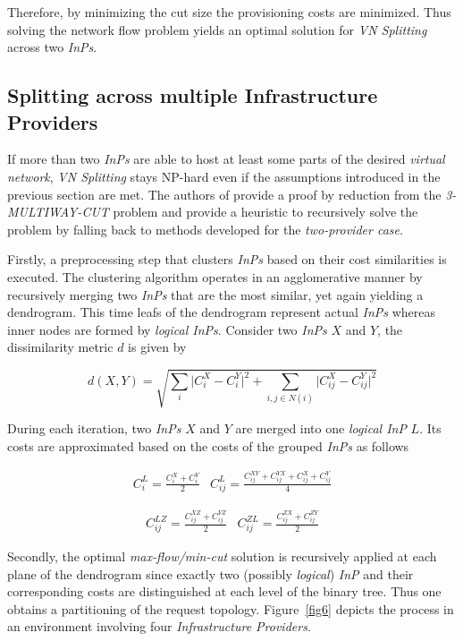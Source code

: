 \documentclass[prodmode,acmtomccap]{acmlarge}
\providecommand{\abs}[1]{\lvert#1\rvert}
\begin{document}
Therefore, by minimizing the cut size the provisioning costs are minimized. Thus  solving the network flow problem yields an optimal solution for \emph{VN Splitting} across two \emph{InPs}.

\subsection{Splitting across multiple Infrastructure Providers}
If more than two \emph{InPs} are able to host at least some parts of the desired \emph{virtual network}, \emph{VN Splitting} stays NP-hard even if the assumptions introduced in the previous section are met.
The authors of  provide a proof by reduction from the \emph{3-MULTIWAY-CUT} problem and provide a heuristic to recursively solve the problem by falling back to methods developed
for the \emph{two-provider case}.

Firstly, a preprocessing step that clusters \emph{InPs} based on their cost similarities is executed. The clustering algorithm operates in an agglomerative manner by recursively merging two
\emph{InPs} that are the most similar, yet again yielding a dendrogram. This time leafs of the dendrogram represent actual \emph{InPs}
whereas inner nodes are formed by \emph{logical InPs}. Consider two \emph{InPs} $X$ and $Y$, the dissimilarity metric $d$ is given by

$$
 d(X,Y) = \sqrt{\sum\limits_{i} \abs{C_i^X - C_i^Y}^2 + \sum\limits_{i, j \in N(i)} \abs{C_{ij}^X - C_{ij}^Y}^2}
$$

During each iteration, two \emph{InPs} $X$ and $Y$ are merged into one \emph{logical InP} $L$. Its costs are approximated based on the costs of the grouped \emph{InPs} as follows

$$
\begin{array}{lr}
	C_i^L = \frac{C_i^X + C_i^Y}{2} & C_{ij}^{L} = \frac{C_{ij}^{XY} + C_{ij}^{YX} + C_{ij}^{X} + C_{ij}^{Y} }{4}
\end{array}
$$

$$
\begin{array}{lr}
	C_{ij}^{LZ} = \frac{C_{ij}^{XZ} + C_{ij}^{YZ}}{2} & C_{ij}^{ZL} = \frac{C_{ij}^{ZX} + C_{ij}^{ZY}}{2} 
\end{array}
$$

Secondly, the optimal \emph{max-flow/min-cut} solution is recursively applied at each plane of the dendrogram
since exactly two (possibly \emph{logical}) \emph{InP} and their corresponding costs are distinguished at each level of the binary tree. Thus one obtains a partitioning of the request topology.
Figure~\ref{fig6} depicts the process in an environment involving four \emph{Infrastructure Providers}. 
\end{document}
